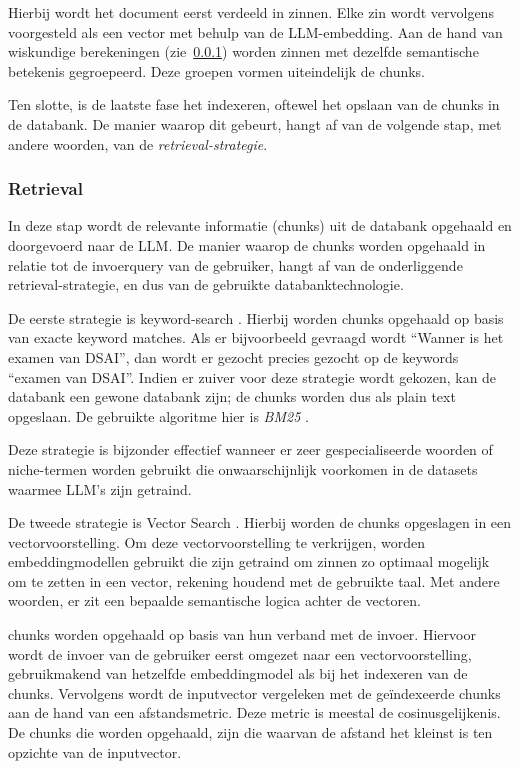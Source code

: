 \begin{enumerate}
\begin{itemize}
            Hierbij wordt het document eerst verdeeld in zinnen. Elke zin wordt vervolgens voorgesteld als een vector met behulp van de LLM-embedding. Aan de hand van wiskundige berekeningen (zie~\ref{subsubsec:retrieval}) worden zinnen met dezelfde semantische betekenis gegroepeerd. Deze groepen vormen uiteindelijk de chunks.
        \end{itemize}
\end{enumerate}

Ten slotte, is de laatste fase het indexeren, oftewel het opslaan van de chunks in de databank. De manier waarop dit gebeurt, hangt af van de volgende stap, met andere woorden, van de \emph{retrieval-strategie}. 

\subsubsection{Retrieval}%
\label{subsubsec:retrieval}
In deze stap wordt de relevante informatie (chunks) uit de databank opgehaald en doorgevoerd naar de \acrshort{LLM}. De manier waarop de chunks worden opgehaald in relatie tot de invoerquery van de gebruiker, hangt af van de onderliggende retrieval-strategie, en dus van de gebruikte databanktechnologie.

De eerste strategie is keyword-search \autocite{Bansal2023}. Hierbij worden chunks opgehaald op basis van exacte keyword matches. Als er bijvoorbeeld gevraagd wordt ``Wanner is het examen van DSAI'', dan wordt er gezocht precies gezocht op de keywords ``examen van DSAI''. Indien er zuiver voor deze strategie wordt gekozen, kan de databank een gewone databank zijn; de chunks worden dus als plain text opgeslaan. De gebruikte algoritme hier is \emph{BM25} \autocite{Bansal2023}.

Deze strategie is bijzonder effectief wanneer er zeer gespecialiseerde woorden of niche-termen worden gebruikt die onwaarschijnlijk voorkomen in de datasets waarmee \acrshort{LLM}'s zijn getraind.

De tweede strategie is Vector Search \autocite{Bansal2023}. Hierbij worden de chunks opgeslagen in een vectorvoorstelling. Om deze vectorvoorstelling te verkrijgen, worden embeddingmodellen gebruikt die zijn getraind om zinnen zo optimaal mogelijk om te zetten in een vector, rekening houdend met de gebruikte taal. Met andere woorden, er zit een bepaalde semantische logica achter de vectoren.

chunks worden opgehaald op basis van hun verband met de invoer. Hiervoor wordt de invoer van de gebruiker eerst omgezet naar een vectorvoorstelling, gebruikmakend van hetzelfde embeddingmodel als bij het indexeren van de chunks. Vervolgens wordt de inputvector vergeleken met de geïndexeerde chunks aan de hand van een afstandsmetric. Deze metric is meestal de cosinusgelijkenis. De chunks die worden opgehaald, zijn die waarvan de afstand het kleinst is ten opzichte van de inputvector.

